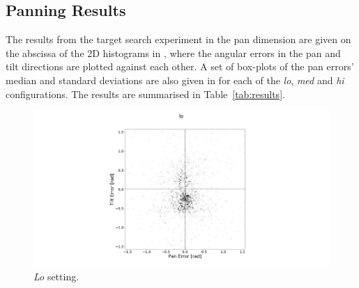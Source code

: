 \documentclass[sigconf, screen=true, anonymous=true]{acmart}
\begin{document}




\subsection{Panning Results}

The results from the target search experiment in the pan dimension are given on the abscissa of the 2D histograms in , where the angular errors in the pan and tilt directions are plotted against each other.
A set of box-plots of the pan errors' median and standard deviations are also given in  for each of the \emph{lo}, \emph{med} and \emph{hi} configurations.
The results are summarised in Table~\ref{tab:results}.

\begin{figure}
  \centering
  \includegraphics[clip, trim=450 0 450 110, width=0.8\columnwidth]{figures/err_lo.png}
  \caption{\emph{Lo} setting. }\label{fig:err-results-lo}
\end{figure}
\end{document}
